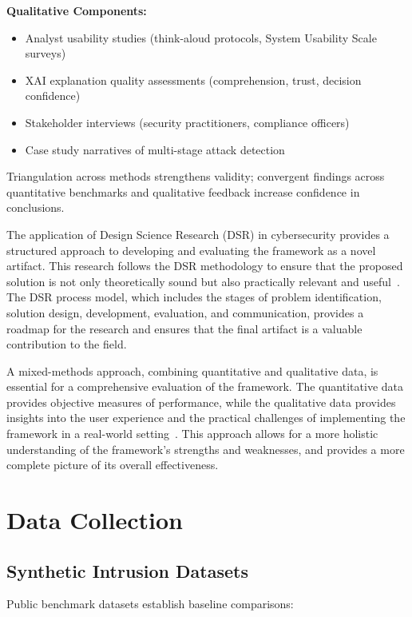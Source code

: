 \textbf{Qualitative Components:}
\begin{itemize}
    \item Analyst usability studies (think-aloud protocols, System Usability Scale surveys)
    \item XAI explanation quality assessments (comprehension, trust, decision confidence)
    \item Stakeholder interviews (security practitioners, compliance officers)
    \item Case study narratives of multi-stage attack detection
\end{itemize}

Triangulation across methods strengthens validity; convergent findings across quantitative benchmarks and qualitative feedback increase confidence in conclusions.

The application of Design Science Research (DSR) in cybersecurity provides a structured approach to developing and evaluating the framework as a novel artifact. This research follows the DSR methodology to ensure that the proposed solution is not only theoretically sound but also practically relevant and useful~\cite{bampel2024dsr}. The DSR process model, which includes the stages of problem identification, solution design, development, evaluation, and communication, provides a roadmap for the research and ensures that the final artifact is a valuable contribution to the field.

A mixed-methods approach, combining quantitative and qualitative data, is essential for a comprehensive evaluation of the framework. The quantitative data provides objective measures of performance, while the qualitative data provides insights into the user experience and the practical challenges of implementing the framework in a real-world setting~\cite{semanticscholar2024mixedmethods}. This approach allows for a more holistic understanding of the framework's strengths and weaknesses, and provides a more complete picture of its overall effectiveness.

\section{Data Collection}\label{sec:method-data}
\subsection{Synthetic Intrusion Datasets}
Public benchmark datasets establish baseline comparisons:

